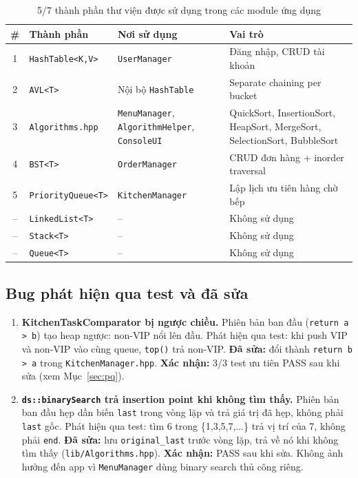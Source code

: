 \documentclass[12pt, a4paper]{article}
\begin{document}
\begin{table}[H]
\centering
\renewcommand{\arraystretch}{1.3}
\begin{tabularx}{\textwidth}{clp{3.4cm}X}
\toprule
\textbf{\#} & \textbf{Thành phần} & \textbf{Nơi sử dụng} & \textbf{Vai trò} \\
\midrule
1 & \texttt{HashTable<K,V>} & \texttt{UserManager} & Đăng nhập, CRUD tài khoản \\
2 & \texttt{AVL<T>} & Nội bộ \texttt{HashTable} & Separate chaining per bucket \\
3 & \texttt{Algorithms.hpp} & \texttt{MenuManager}, \texttt{AlgorithmHelper}, \texttt{ConsoleUI} &
  QuickSort, InsertionSort, HeapSort, MergeSort, SelectionSort, BubbleSort \\
4 & \texttt{BST<T>} & \texttt{OrderManager} & CRUD đơn hàng + inorder traversal \\
5 & \texttt{PriorityQueue<T>} & \texttt{KitchenManager} & Lập lịch ưu tiên hàng chờ bếp \\
\midrule
-- & \texttt{LinkedList<T>} & -- & Không sử dụng \\
-- & \texttt{Stack<T>} & -- & Không sử dụng \\
-- & \texttt{Queue<T>} & -- & Không sử dụng \\
\bottomrule
\end{tabularx}
\caption{5/7 thành phần thư viện được sử dụng trong các module ứng dụng}
\end{table}

\subsection{Bug phát hiện qua test và đã sửa}

\begin{enumerate}
  \item \textbf{KitchenTaskComparator bị ngược chiều.}
        Phiên bản ban đầu (\texttt{return a > b}) tạo heap ngược: non-VIP nổi lên đầu.
        Phát hiện qua test: khi push VIP và non-VIP vào cùng queue, \texttt{top()} trả non-VIP.
        \textbf{Đã sửa:} đổi thành \texttt{return b > a} trong \texttt{KitchenManager.hpp}.
        \textbf{Xác nhận:} 3/3 test ưu tiên PASS sau khi sửa (xem Mục~\ref{sec:pq}).

  \item \textbf{\texttt{ds::binarySearch} trả insertion point khi không tìm thấy.}
        Phiên bản ban đầu hẹp dần biến \texttt{last} trong vòng lặp và trả giá trị đã hẹp,
        không phải \texttt{last} gốc. Phát hiện qua test: tìm 6 trong \{1,3,5,7,...\}
        trả vị trí của 7, không phải \texttt{end}.
        \textbf{Đã sửa:} lưu \texttt{original\_last} trước vòng lặp, trả về nó khi không tìm thấy
        (\texttt{lib/Algorithms.hpp}).
        \textbf{Xác nhận:} PASS sau khi sửa. Không ảnh hưởng đến app vì
        \texttt{MenuManager} dùng binary search thủ công riêng.
\end{enumerate}
\end{document}
